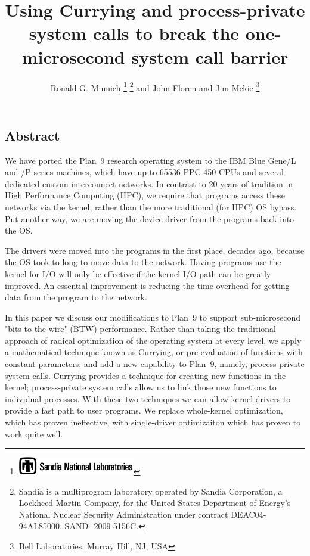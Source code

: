 \documentclass[letterpaper,twocolumn,10pt]{article}
\date{}
\begin{document}
\author{Ronald G. Minnich%
\thanks{\protect\includegraphics[height=0.3in]{thunderchicken}%
}%
\thanks{Sandia is a multiprogram laboratory operated by Sandia Corporation, a Lockheed Martin Company, for the United States Department of Energy’s National Nuclear Security Administration under contract DE­AC04­94AL85000. SAND- 2009-5156C.}  and John Floren and Jim Mckie
\thanks{Bell Laboratories, Murray Hill, NJ, USA }
}
\title{\Large \bf Using Currying and process-private system calls to break the one-microsecond system call barrier}
\maketitle
\thispagestyle{empty}
\pagestyle{empty}
\subsection*{Abstract}
We have ported the Plan~9 research operating system to the IBM Blue Gene/L and /P series machines, which have up to 65536 PPC 450 CPUs and several dedicated custom interconnect networks. In contrast 
to 20 years of tradition in High Performance Computing (HPC), we require that programs access these networks via
the kernel, rather than the more traditional (for HPC) OS bypass. Put another way, we are moving the device driver from the 
programs back into the OS. 

The drivers were moved into the programs in the first place, decades ago, because the OS took to long to move data to the network. Having programs use the kernel for I/O will only be effective if the kernel I/O path can be greatly improved. An essential improvement is reducing the time overhead for getting data from the program to the network. 

In this paper we discuss our modifications to  Plan~9 to support sub-microsecond "bits to the wire" (BTW) 
performance. Rather than taking the traditional approach of radical optimization of the operating system at 
every level, we apply a mathematical technique known as Currying, or pre-evaluation of functions with constant 
parameters; and add a new capability to Plan~9, namely, process-private system calls. Currying provides 
a technique for creating new functions in the kernel; process-private system calls allow us to link 
those new functions to individual processes. With these two techniques we can allow kernel drivers to provide a fast path to user programs. We replace whole-kernel optimization, which has proven ineffective, with single-driver optimizaiton which has proven to work quite well. 
\end{document}
